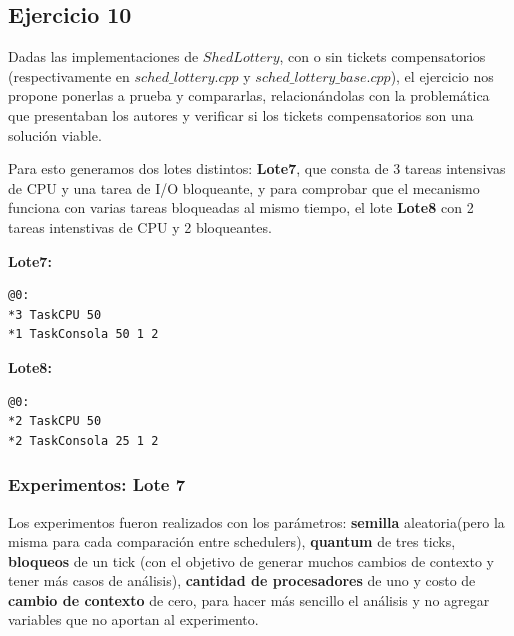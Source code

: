 
\subsection{Ejercicio 10}

Dadas las implementaciones de $ShedLottery$, con o sin tickets compensatorios (respectivamente en $sched\_lottery.cpp$ y $sched\_lottery\_base.cpp$), el ejercicio nos propone ponerlas a prueba y compararlas, relacion\'andolas con la problem\'atica que presentaban los autores y verificar si los tickets compensatorios son una soluci\'on viable. 

\vspace{2mm}

Para esto generamos dos lotes distintos: \textbf{Lote7}, que consta de 3 tareas intensivas de CPU y una tarea de I/O bloqueante, y para comprobar que el mecanismo funciona con varias tareas bloqueadas al mismo tiempo, el lote \textbf{Lote8} con 2 tareas intenstivas de CPU y 2 bloqueantes.

\vspace{2mm}
\textbf{Lote7:}

\begin{lstlisting}[numbers=none]
@0:
*3 TaskCPU 50
*1 TaskConsola 50 1 2
\end{lstlisting}

\vspace{2mm}
\textbf{Lote8:}

\begin{lstlisting}[numbers=none]
@0:
*2 TaskCPU 50
*2 TaskConsola 25 1 2
\end{lstlisting}

\subsubsection{Experimentos: Lote 7}

\vspace{2mm}

Los experimentos fueron realizados con los par\'ametros: \textbf{semilla} aleatoria(pero la misma para cada comparaci\'on entre schedulers), \textbf{quantum} de tres ticks, \textbf{bloqueos} de un tick (con el objetivo de generar muchos cambios de contexto y tener m\'as casos de an\'alisis), \textbf{cantidad de procesadores} de uno y costo de \textbf{cambio de contexto} de cero, para hacer m\'as sencillo el an\'alisis y no agregar variables que no aportan al experimento.

\vspace{2mm}

